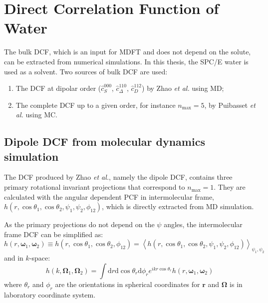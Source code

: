 
\chapter{Direct Correlation Function of Water\label{chpt:dcf-water}}

The bulk \acs{DCF}, which is an input for \acs{MDFT} and does not
depend on the solute, can be extracted from numerical simulations.
In this thesis, the SPC/E water is used as a solvent. Two sources of
bulk \acs{DCF} are used: 
\begin{enumerate}
\item The \acs{DCF} at dipolar order ($\hat{c}_{S}^{000}$, $\hat{c}_{\Delta}^{110}$,
$\hat{c}_{D}^{112}$) by Zhao \textit{et al.} \citep{zhao_accurate_2013}
using \acs{MD};
\item The complete \acs{DCF} up to a given order, for instance $n_{\max}=5$,
by Puibasset \textit{et al.} \citep{puibasset_bridge_2012} using
\acs{MC}.
\end{enumerate}

\section{Dipole DCF from molecular dynamics simulation}

The \acs{DCF} produced by Zhao \textit{et al.}, namely the dipole
\acs{DCF}, contains three primary rotational invariant projections
that correspond to $n_{\max}=1$. They are calculated with the
angular dependent \acs{PCF} in intermolecular frame, $h(r,\cos\theta_{1},\cos\theta_{2},\psi_{1},\psi_{2},\phi_{12})$,
which is directly extracted from \acs{MD} simulation. 

As the primary projections do not depend on the $\psi$ angles, the
intermolecular frame \acs{DCF} can be simplified as:
\begin{equation}
h(r,\boldsymbol{\omega}_{1},\boldsymbol{\omega}_{2})\equiv h(r,\cos\theta_{1},\cos\theta_{2},\phi_{12})=\left\langle h(r,\cos\theta_{1},\cos\theta_{2},\psi_{1},\psi_{2},\phi_{12})\right\rangle _{\psi_{1},\psi_{2}}\label{eq:h-linear}
\end{equation}
and in $k$-space:
\begin{equation}
h(k,\mathbf{\Omega}_{1},\mathbf{\Omega}_{2})=\int\mathrm{d}r\mathrm{d}\cos\theta_{r}\mathrm{d}\phi_{r}e^{ikr\cos\theta_{r}}h(r,\boldsymbol{\omega}_{1},\boldsymbol{\omega}_{2})
\end{equation}
where $\theta_{r}$ and $\phi_{r}$ are the orientations in spherical
coordinates for $\mathbf{r}$ and $\mathbf{\Omega}$ is in laboratory
coordinate system.

